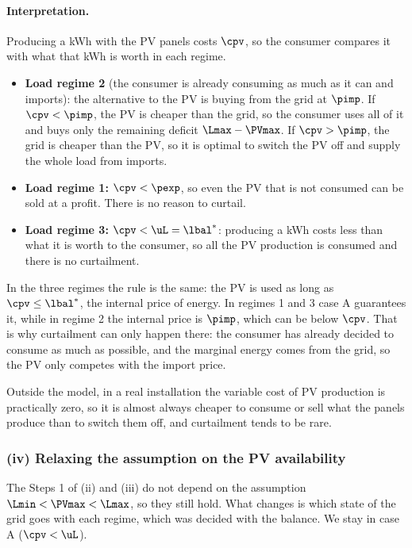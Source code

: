 \paragraph{Interpretation.}
Producing a kWh with the PV panels costs $\cpv$, so the consumer compares it with what that
kWh is worth in each regime.
\begin{itemize}
    \item \textbf{Load regime 2} (the consumer is already consuming as much as it can and
    imports): the alternative to the PV is buying from the grid at $\pimp$. If
    $\cpv < \pimp$, the PV is cheaper than the grid, so the consumer uses all of it and buys
    only the remaining deficit $\Lmax - \PVmax$. If $\cpv > \pimp$, the grid is cheaper than
    the PV, so it is optimal to switch the PV off and supply the whole load from imports.
    \item \textbf{Load regime 1:} $\cpv < \pexp$, so even the PV that is not consumed can be
    sold at a profit. There is no reason to curtail.
    \item \textbf{Load regime 3:} $\cpv < \uL = {\lbal}^*$: producing a kWh costs less than
    what it is worth to the consumer, so all the PV production is consumed and there is no
    curtailment.
\end{itemize}
In the three regimes the rule is the same: the PV is used as long as $\cpv \leq {\lbal}^*$,
the internal price of energy. In regimes 1 and 3 case A guarantees it, while in regime 2 the
internal price is $\pimp$, which can be below $\cpv$. That is why curtailment can only happen
there: the consumer has already decided to consume as much as possible, and the marginal energy
comes from the grid, so the PV only competes with the import price.

Outside the model, in a real installation the variable cost of PV production is practically
zero, so it is almost always cheaper to consume or sell what the panels produce than to
switch them off, and curtailment tends to be rare.

\subsubsection{(iv) Relaxing the assumption on the PV availability}
The Steps 1 of (ii) and (iii) do not depend on the assumption $\Lmin < \PVmax < \Lmax$, so
they still hold. What changes is which state of the grid goes with each regime, which was
decided with the balance. We stay in case A ($\cpv < \uL$).

